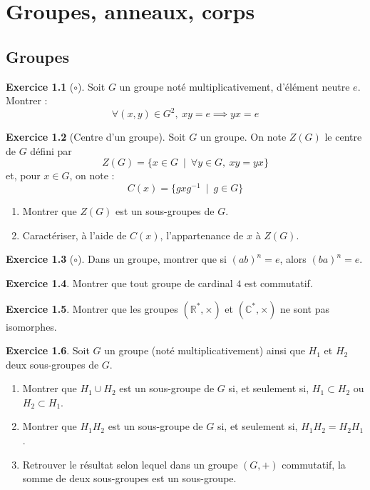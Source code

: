 \documentclass[french]{book}
\newcommand{\R}{\mathbb{R}}
\newcommand{\C}{\mathbb{C}}
\newcommand{\st}{^*}
\newcommand{\inv}{^{-1}}
\theoremstyle{definition}
\newtheorem{ex}{Exercice}[chapter]
\theoremstyle{theorem}
\theoremstyle{remark}
\begin{document}
\chapter{Groupes, anneaux, corps}

\section{Groupes}

\begin{ex}[$\circ$]
	Soit $G$ un groupe noté multiplicativement, d'élément neutre $e$. Montrer : $$\forall (x,y)\in G^2,\ xy=e\implies yx=e$$
\end{ex}

\begin{ex}[Centre d'un groupe]
	Soit $G$ un groupe. On note $Z(G)$ le centre de $G$ défini par $$Z(G)=\{x\in G\ \mid \ \forall y\in G,\ xy=yx\}$$ et, pour $x\in G$, on note : $$C(x)=\{gxg\inv\ \mid\ g\in G\}$$
	\begin{enumerate}
		\item Montrer que $Z(G)$ est un sous-groupes de $G$.
		\item Caractériser, à l'aide de $C(x)$, l'appartenance de $x$ à $Z(G)$.
	\end{enumerate}
\end{ex}

\begin{ex}[$\circ$]
	Dans un groupe, montrer que si $(ab)^n=e$, alors $(ba)^n=e$.
\end{ex}

\begin{ex}
	Montrer que tout groupe de cardinal $4$ est commutatif.
\end{ex}

\begin{ex}
	Montrer que les groupes $(\R\st,\times)$ et $(\C\st,\times)$ ne sont pas isomorphes.
\end{ex}

\begin{ex}
	Soit $G$ un groupe (noté multiplicativement) ainsi que $H_1$ et $H_2$ deux sous-groupes de $G$.
	\begin{enumerate}
		\item Montrer que $H_1\cup H_2$ est un sous-groupe de $G$ si, et seulement si, $H_1\subset H_2$ ou $H_2\subset H_1$.
		\item Montrer que $H_1H_2$ est un sous-groupe de $G$ si, et seulement si, $H_1H_2=H_2H_1$.
		\item Retrouver le résultat selon lequel dans un groupe $(G,+)$ commutatif, la somme de deux sous-groupes est un sous-groupe.
	\end{enumerate}
\end{ex}
\end{document}
